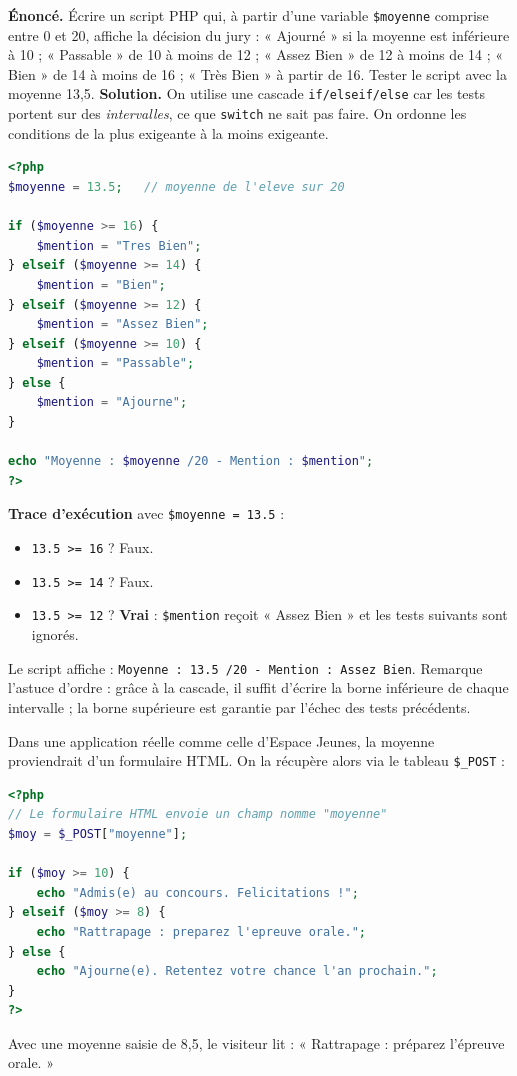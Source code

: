 \documentclass[11pt]{article}
\begin{document}
\begin{exoresolu}
\textbf{Énoncé.} Écrire un script PHP qui, à partir d'une variable \texttt{\$moyenne} comprise entre 0 et 20, affiche la décision du jury : « Ajourné » si la moyenne est inférieure à 10 ; « Passable » de 10 à moins de 12 ; « Assez Bien » de 12 à moins de 14 ; « Bien » de 14 à moins de 16 ; « Très Bien » à partir de 16. Tester le script avec la moyenne 13,5.
\tcblower
\textbf{Solution.} On utilise une cascade \texttt{if/elseif/else} car les tests portent sur des \emph{intervalles}, ce que \texttt{switch} ne sait pas faire. On ordonne les conditions de la plus exigeante à la moins exigeante.
\begin{lstlisting}[language=Php]
<?php
$moyenne = 13.5;   // moyenne de l'eleve sur 20

if ($moyenne >= 16) {
    $mention = "Tres Bien";
} elseif ($moyenne >= 14) {
    $mention = "Bien";
} elseif ($moyenne >= 12) {
    $mention = "Assez Bien";
} elseif ($moyenne >= 10) {
    $mention = "Passable";
} else {
    $mention = "Ajourne";
}

echo "Moyenne : $moyenne /20 - Mention : $mention";
?>
\end{lstlisting}
\textbf{Trace d'exécution} avec \texttt{\$moyenne = 13.5} :
\begin{itemize}
  \item \texttt{13.5 >= 16} ? Faux.
  \item \texttt{13.5 >= 14} ? Faux.
  \item \texttt{13.5 >= 12} ? \textbf{Vrai} : \texttt{\$mention} reçoit « Assez Bien » et les tests suivants sont ignorés.
\end{itemize}
Le script affiche : \texttt{Moyenne : 13.5 /20 - Mention : Assez Bien}. Remarque l'astuce d'ordre : grâce à la cascade, il suffit d'écrire la borne inférieure de chaque intervalle ; la borne supérieure est garantie par l'échec des tests précédents.
\end{exoresolu}

Dans une application réelle comme celle d'Espace Jeunes, la moyenne proviendrait d'un formulaire HTML. On la récupère alors via le tableau \texttt{\$\_POST} :

\begin{exemplebox}
\begin{lstlisting}[language=Php]
<?php
// Le formulaire HTML envoie un champ nomme "moyenne"
$moy = $_POST["moyenne"];

if ($moy >= 10) {
    echo "Admis(e) au concours. Felicitations !";
} elseif ($moy >= 8) {
    echo "Rattrapage : preparez l'epreuve orale.";
} else {
    echo "Ajourne(e). Retentez votre chance l'an prochain.";
}
?>
\end{lstlisting}
Avec une moyenne saisie de 8,5, le visiteur lit : « Rattrapage : préparez l'épreuve orale. »
\end{exemplebox}
\end{document}
